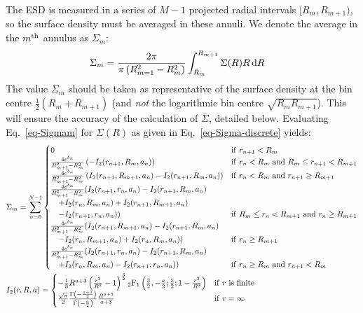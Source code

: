\documentclass{article}
\begin{document}
The ESD is measured in a series of $M-1$ projected radial intervals $[R_m, R_{m+1})$, so the surface density must be averaged in these annuli. We denote the average in the $m^{\rm th}$ annulus as $\Sigma_m$:
\begin{align}
  \Sigma_m &= \frac{2\pi}{\pi\left(R_{m=1}^2-R_m^2\right)}\int_{R_m}^{R_{m+1}}\Sigma(R)R\,{\rm d}R \label{eq-Sigmam}
\end{align}
The value $\Sigma_m$ should be taken as representative of the surface density at the bin centre $\frac{1}{2}\left(R_m+R_{m+1}\right)$ (and \emph{not} the logarithmic bin centre $\sqrt{R_mR_{m+1}}$). This will ensure the accuracy of the calculation of $\bar{\Sigma}$, detailed below. Evaluating Eq.~\ref{eq-Sigmam} for $\Sigma(R)$ as given in Eq.~\ref{eq-Sigma-discrete} yields:
\begin{align}
  &\Sigma_m = \sum_{n=0}^{N-1}
  \begin{cases}
    0 & {\rm if}\ r_{n+1} < R_m\\
    \frac{4e^{b_n}}{R_{m+1}^2-R_m^2} \left(-I_2(r_{n+1},R_m,a_n)\right) & {\rm if}\ r_n < R_m\ {\rm and}\ R_m \leq r_{n+1} < R_{m+1}\\
    \frac{4e^{b_n}}{R_{m+1}^2-R_m^2} \left(I_2(r_{n+1},R_{m+1},a_n)-I_2(r_{n+1},R_m,a_n)\right) & {\rm if}\ r_n < R_m\ {\rm and}\ r_{n+1} \geq R_{m+1}\\
    \frac{4e^{b_n}}{R_{m+1}^2-R_m^2} (I_2(r_{n+1},r_n,a_n)-I_2(r_{n+1},R_m,a_n)\\ \quad +I_2(r_n,R_m,a_n)+I_2(r_{n+1},R_{m+1},a_n)\\ \quad -I_2(r_{n+1},r_n,a_n)) & {\rm if}\ R_m \leq r_n < R_{m+1}\ {\rm and}\ r_n \geq R_{m+1}\\
    \frac{4e^{b_n}}{R_{m+1}^2-R_m^2} (I_2(r_{n+1},R_{m+1},a_n)-I_2(r_{n+1},R_m,a_n)\\ \quad -I_2(r_n,R_{m+1},a_n)+I_2(r_n,R_m,a_n)) & {\rm if}\ r_n \geq R_{m+1}\\
    \frac{4e^{b_n}}{R_{m+1}^2-R_m^2} (I_2(r_{n+1},r_n,a_n)-I_2(r_{n+1},R_m,a_n)\\ \quad +I_2(r_n,R_m,a_n)-I_2(r_{n+1},r_n,a_n)) & {\rm if}\ r_n \geq R_m\ {\rm and}\ r_{n+1} < R_m\\
  \end{cases}\\
  &I_2(r,R,a) =
  \begin{cases}
    -\frac{1}{3}R^{a+3}\left(\frac{r^2}{R^2}-1\right)^{\frac{3}{2}}{}_2{\rm F}_1\left(\frac{3}{2},-\frac{a}{2};\frac{5}{2};1-\frac{r^2}{R^2}\right) & {\rm if}\ r\ {\rm is}\ {\rm finite}\\
    \frac{\sqrt{\pi}}{2}\frac{\Gamma\left(-\frac{a+1}{2}\right)}{\Gamma\left(-\frac{a}{2}\right)}\frac{R^{a+3}}{a+3} & {\rm if}\ r=\infty
  \end{cases}
\end{align}
\end{document}
